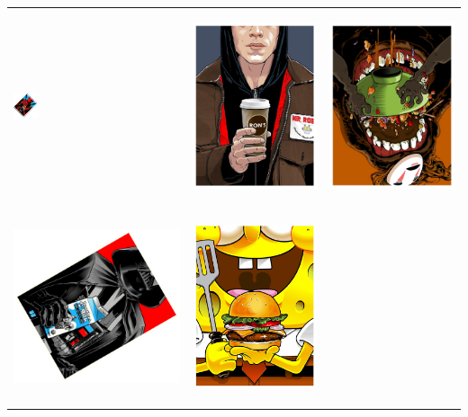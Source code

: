\documentclass[12pt, a4paper]{article}
\begin{document}
\newpage
\begin{table}[H]
\begin{center}
\begin{tabular}{ m{5 cm}  m{3.5 cm} m{3.5 cm} }

 \begin{center} \includegraphics[width= 3.5 cm, angle =45, height= 4.6 cm]{pop4.pdf} \end{center}
 
 &\begin{center} \includegraphics[width= 2.1 cm ]{pop5.pdf} \end{center}
 
& \begin{center}\includegraphics[width= 2.1 cm, angle = 180]{pop6.pdf} \end{center} \\

\begin{center} \includegraphics[width= 3.5 cm, angle = 60 ]{pop9.pdf} \end{center}

&\begin{center}\includegraphics[width= 2.1 cm, height= 2.8 cm]{pop8.pdf} \end{center}


\end{tabular}
\end{center}
\end{table}
\end{document}
